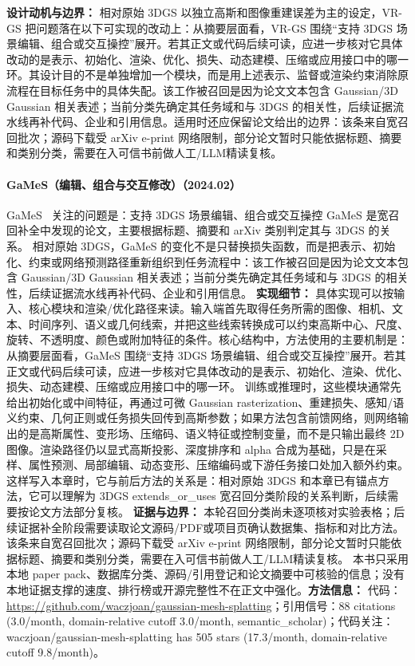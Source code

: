 \textbf{设计动机与边界：} 相对原始 3DGS 以独立高斯和图像重建误差为主的设定，VR-GS 把问题落在以下可实现的改动上：从摘要层面看，VR-GS 围绕“支持 3DGS 场景编辑、组合或交互操控”展开。若其正文或代码后续可读，应进一步核对它具体改动的是表示、初始化、渲染、优化、损失、动态建模、压缩或应用接口中的哪一环。其设计目的不是单独增加一个模块，而是用上述表示、监督或渲染约束消除原流程在目标任务中的具体失配。该工作被召回是因为论文文本包含 Gaussian/3D Gaussian 相关表述；当前分类先确定其任务域和与 3DGS 的相关性，后续证据流水线再补代码、企业和引用信息。适用时还应保留论文给出的边界：该条来自宽召回批次；源码下载受 arXiv e-print 网络限制，部分论文暂时只能依据标题、摘要和类别分类，需要在入可信书前做人工/LLM精读复核。
\paragraph{GaMeS（编辑、组合与交互修改）（2024.02）}
GaMeS~\cite{2402_01459} 关注的问题是：支持 3DGS 场景编辑、组合或交互操控 GaMeS 是宽召回补全中发现的论文，主要根据标题、摘要和 arXiv 类别判定其与 3DGS 的关系。
相对原始 3DGS，GaMeS 的变化不是只替换损失函数，而是把表示、初始化、约束或网络预测路径重新组织到任务流程中：该工作被召回是因为论文文本包含 Gaussian/3D Gaussian 相关表述；当前分类先确定其任务域和与 3DGS 的相关性，后续证据流水线再补代码、企业和引用信息。
\textbf{实现细节：} 具体实现可以按输入、核心模块和渲染/优化路径来读。输入端首先取得任务所需的图像、相机、文本、时间序列、语义或几何线索，并把这些线索转换成可以约束高斯中心、尺度、旋转、不透明度、颜色或附加特征的条件。核心结构中，方法使用的主要机制是：从摘要层面看，GaMeS 围绕“支持 3DGS 场景编辑、组合或交互操控”展开。若其正文或代码后续可读，应进一步核对它具体改动的是表示、初始化、渲染、优化、损失、动态建模、压缩或应用接口中的哪一环。 训练或推理时，这些模块通常先给出初始化或中间特征，再通过可微 Gaussian rasterization、重建损失、感知/语义约束、几何正则或任务损失回传到高斯参数；如果方法包含前馈网络，则网络输出的是高斯属性、变形场、压缩码、语义特征或控制变量，而不是只输出最终 2D 图像。渲染路径仍以显式高斯投影、深度排序和 alpha 合成为基础，只是在采样、属性预测、局部编辑、动态变形、压缩编码或下游任务接口处加入额外约束。这样写入本章时，它与前后方法的关系是：相对原始 3DGS 和本章已有锚点方法，它可以理解为 3DGS extends\_or\_uses 宽召回分类阶段的关系判断，后续需要按论文方法部分复核。
\textbf{证据与边界：} 本轮召回分类尚未逐项核对实验表格；后续证据补全阶段需要读取论文源码/PDF或项目页确认数据集、指标和对比方法。 该条来自宽召回批次；源码下载受 arXiv e-print 网络限制，部分论文暂时只能依据标题、摘要和类别分类，需要在入可信书前做人工/LLM精读复核。 本书只采用本地 paper pack、数据库分类、源码/引用登记和论文摘要中可核验的信息；没有本地证据支撑的速度、排行榜或开源完整性不在正文中强化。\textbf{方法信息：} 代码：\url{https://github.com/waczjoan/gaussian-mesh-splatting}；引用信号：88 citations (3.0/month, domain-relative cutoff 3.0/month, semantic\_scholar)；代码关注：waczjoan/gaussian-mesh-splatting has 505 stars (17.3/month, domain-relative cutoff 9.8/month)。
